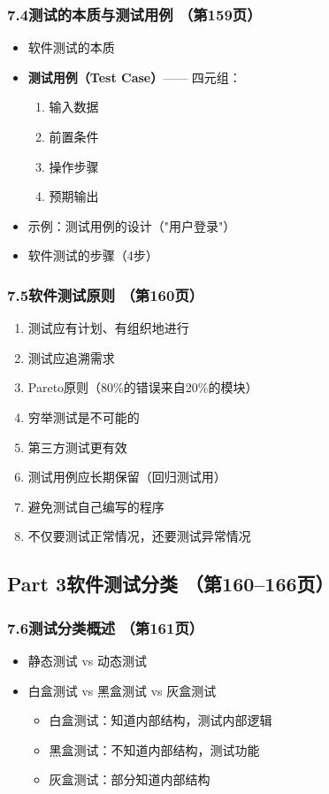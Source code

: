 \documentclass[12pt,a4paper]{ctexart}
\begin{document}
\subsubsection{7.4\quad 测试的本质与测试用例 \hfill（第159页）}
\begin{itemize}
    \item 软件测试的本质
    \item \textbf{测试用例（Test Case）}—— 四元组：
    \begin{enumerate}
        \item 输入数据
        \item 前置条件
        \item 操作步骤
        \item 预期输出
    \end{enumerate}
    \item 示例：测试用例的设计（"用户登录"）
    \item 软件测试的步骤（4步）
\end{itemize}

\subsubsection{7.5\quad 软件测试原则 \hfill（第160页）}
\begin{enumerate}
    \item 测试应有计划、有组织地进行
    \item 测试应追溯需求
    \item Pareto原则（80\%的错误来自20\%的模块）
    \item 穷举测试是不可能的
    \item 第三方测试更有效
    \item 测试用例应长期保留（回归测试用）
    \item 避免测试自己编写的程序
    \item 不仅要测试正常情况，还要测试异常情况
\end{enumerate}

\subsection{Part 3\quad 软件测试分类 \hfill（第160--166页）}

\subsubsection{7.6\quad 测试分类概述 \hfill（第161页）}
\begin{itemize}
    \item 静态测试 vs 动态测试
    \item 白盒测试 vs 黑盒测试 vs 灰盒测试
    \begin{itemize}
        \item 白盒测试：知道内部结构，测试内部逻辑
        \item 黑盒测试：不知道内部结构，测试功能
        \item 灰盒测试：部分知道内部结构
    \end{itemize}
\end{itemize}
\end{document}
